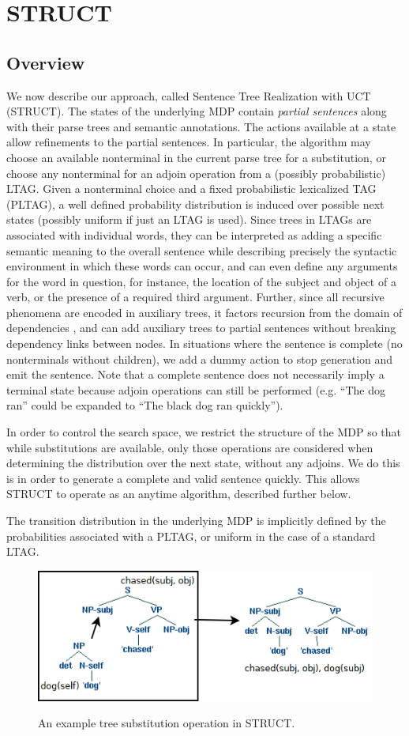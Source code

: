 \section{STRUCT}
\subsection{Overview}
We now describe our approach, called Sentence Tree Realization with
UCT (STRUCT). The states of the underlying MDP contain {\em partial
 sentences} along with their parse trees and semantic annotations.
The actions available at a
state allow refinements to the partial sentences. In particular, the
algorithm may choose an available nonterminal in the current parse
tree for a substitution, or choose any nonterminal for an adjoin operation from a (possibly
probabilistic) LTAG. Given a nonterminal choice and a fixed
probabilistic lexicalized TAG (PLTAG), a well defined probability
distribution is induced over possible next states (possibly uniform if
just an LTAG is used).   Since trees in LTAGs are associated
with individual words, they can be interpreted as adding a specific
semantic meaning to the overall sentence while describing precisely
the syntactic environment in which these words can occur, and can even
define any arguments for the word in question, for instance, the
location of the subject and object of a verb, or the presence of a
required third argument.  Further, since all recursive phenomena are
encoded in auxiliary trees, it factors recursion from the domain of
dependencies \cite{bauer2009statistical}, and can add auxiliary trees
to partial sentences without breaking dependency links between nodes.
In situations where the sentence is complete (no nonterminals without
children), we add a dummy action to stop generation and emit the
sentence.  Note that a complete sentence does not necessarily imply
a terminal state because adjoin operations can still be performed
(e.g. ``The dog ran'' could be expanded to ``The black dog ran quickly'').

In order to control the search space, we restrict the structure of the
MDP so that while substitutions are available, only those operations
are considered when determining the distribution over the next state,
without any adjoins.  We do this is in order to generate a
complete and valid sentence quickly.  This allows STRUCT to operate as
an anytime algorithm, described further below.

 The transition distribution in
 the underlying MDP is implicitly defined by the probabilities
 associated with a PLTAG, or uniform in the case of a standard LTAG.
\begin{figure}[t]
\centering
\includegraphics[width= 0.7 \linewidth]{sub-example.png}\label{examples-s}
\caption{An example tree substitution operation in STRUCT.}
\end{figure}

